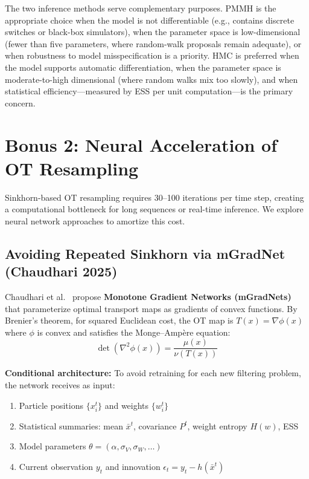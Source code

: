 \documentclass[12pt,a4paper]{article}
\theoremstyle{definition}
\theoremstyle{remark}
\begin{document}
The two inference methods serve complementary purposes. PMMH is the appropriate choice when the model is not differentiable (e.g., contains discrete switches or black-box simulators), when the parameter space is low-dimensional (fewer than five parameters, where random-walk proposals remain adequate), or when robustness to model misspecification is a priority. HMC is preferred when the model supports automatic differentiation, when the parameter space is moderate-to-high dimensional (where random walks mix too slowly), and when statistical efficiency---measured by ESS per unit computation---is the primary concern.


\section{Bonus 2: Neural Acceleration of OT Resampling}
\label{sec:bonus2}

Sinkhorn-based OT resampling requires 30--100 iterations per time step, creating a computational bottleneck for long sequences or real-time inference. We explore neural network approaches to amortize this cost.

\subsection{Avoiding Repeated Sinkhorn via mGradNet (Chaudhari 2025)}

Chaudhari et al.\ \citep{chaudhari2025} propose \textbf{Monotone Gradient Networks (mGradNets)} that parameterize optimal transport maps as gradients of convex functions. By Brenier's theorem, for squared Euclidean cost, the OT map is $T(x) = \nabla \phi(x)$ where $\phi$ is convex and satisfies the Monge--Amp\`ere equation:
\begin{equation}
	\det(\nabla^2 \phi(x)) = \frac{\mu(x)}{\nu(T(x))}
\end{equation}

\textbf{Conditional architecture:} To avoid retraining for each new filtering problem, the network receives as input:
\begin{enumerate}
	\item Particle positions $\{x_i^t\}$ and weights $\{w_i^t\}$
	\item Statistical summaries: mean $\bar{x}^t$, covariance $P^t$, weight entropy $H(w)$, ESS
	\item Model parameters $\theta = (\alpha, \sigma_V, \sigma_W, \ldots)$
	\item Current observation $y_t$ and innovation $\epsilon_t = y_t - h(\bar{x}^t)$
\end{enumerate}
\end{document}
